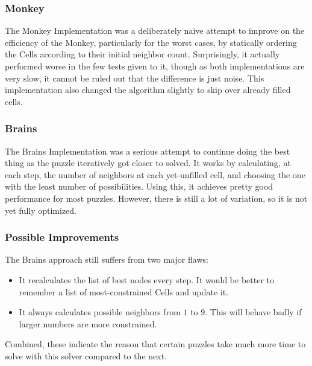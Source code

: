 \documentclass[letterpaper]{article}
\begin{document}
\subsubsection{Monkey}
The Monkey Implementation was a deliberately naive attempt to improve on the efficiency of the Monkey, particularly for the worst cases, by statically ordering the Cells according to their initial neighbor count. Surprisingly, it actually performed worse in the few tests given to it, though as both implementations are very slow, it cannot be ruled out that the difference is just noise. This implementation also changed the algorithm slightly to skip over already filled cells.

\subsubsection{Brains}
The Brains Implementation was a serious attempt to continue doing the best thing as the puzzle iteratively got closer to solved. It works by calculating, at each step, the number of neighbors at each yet-unfilled cell, and choosing the one with the least number of possibilities. Using this, it achieves pretty good performance for most puzzles. However, there is still a lot of variation, so it is not yet fully optimized.

\subsubsection{Possible Improvements}
The Brains approach still suffers from two major flaws:
\begin{itemize}
\item It recalculates the list of best nodes every step. It would be better to remember a list of most-constrained Cells and update it.
\item It always calculates possible neighbors from $ 1 $ to $ 9 $. This will behave badly if larger numbers are more constrained.
\end{itemize}
Combined, these indicate the reason that certain puzzles take much more time to solve with this solver compared to the next.
\end{document}
